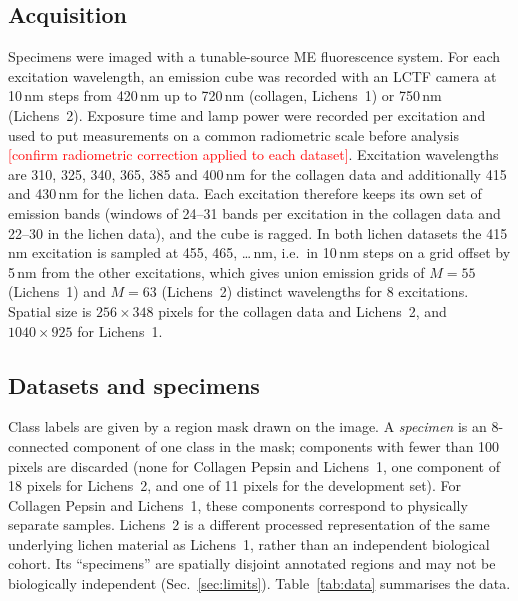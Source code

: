 \documentclass[journal]{IEEEtran}
\newcommand{\RESULT}[1]{\textcolor{red}{[#1]}}
\begin{document}
\subsection{Acquisition}
Specimens were imaged with a tunable-source ME fluorescence system. For each excitation wavelength, an emission cube was recorded with an LCTF camera at 10\,nm steps from 420\,nm up to 720\,nm (collagen, Lichens~1) or 750\,nm (Lichens~2). Exposure time and lamp power were recorded per excitation and used to put measurements on a common radiometric scale before analysis \RESULT{confirm radiometric correction applied to each dataset}. Excitation wavelengths are 310, 325, 340, 365, 385 and 400\,nm for the collagen data and additionally 415 and 430\,nm for the lichen data. Each excitation therefore keeps its own set of emission bands (windows of 24--31 bands per excitation in the collagen data and 22--30 in the lichen data), and the cube is ragged. In both lichen datasets the 415\,nm excitation is sampled at 455, 465, \dots\,nm, i.e.\ in 10\,nm steps on a grid offset by 5\,nm from the other excitations, which gives union emission grids of $M=55$ (Lichens~1) and $M=63$ (Lichens~2) distinct wavelengths for 8 excitations. Spatial size is $256\times348$ pixels for the collagen data and Lichens~2, and $1040\times925$ for Lichens~1.

\subsection{Datasets and specimens}
Class labels are given by a region mask drawn on the image. A \emph{specimen} is an 8-connected component of one class in the mask; components with fewer than 100 pixels are discarded (none for Collagen Pepsin and Lichens~1, one component of 18 pixels for Lichens~2, and one of 11 pixels for the development set). For Collagen Pepsin and Lichens~1, these components correspond to physically separate samples. Lichens~2 is a different processed representation of the same underlying lichen material as Lichens~1, rather than an independent biological cohort. Its ``specimens'' are spatially disjoint annotated regions and may not be biologically independent (Sec.~\ref{sec:limits}). Table~\ref{tab:data} summarises the data.
\end{document}
